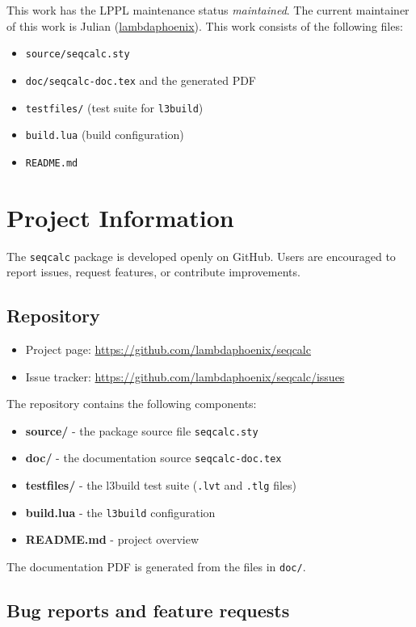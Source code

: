 \documentclass[a4paper,1pt]{article}
\begin{document}
\noindent This work has the LPPL maintenance status \emph{maintained}. The
current maintainer of this work is Julian (\href{https://github.com/lambdaphoenix}{lambdaphoenix}).
This work consists of the following files:
\begin{itemize}
    \item \texttt{source/seqcalc.sty}
    \item \texttt{doc/seqcalc-doc.tex} and the generated PDF
    \item \texttt{testfiles/} (test suite for \texttt{l3build})
    \item \texttt{build.lua} (build configuration)
    \item \texttt{README.md}
\end{itemize}
\section{Project Information}

The \texttt{seqcalc} package is developed openly on GitHub.
Users are encouraged to report issues, request features, or contribute
improvements.

\subsection*{Repository}

\begin{itemize}
    \item Project page:
        \url{https://github.com/lambdaphoenix/seqcalc}
    \item Issue tracker:
        \url{https://github.com/lambdaphoenix/seqcalc/issues}
\end{itemize}
The repository contains the following components:
\begin{itemize}
    \item \textbf{source/} - the package source file \texttt{seqcalc.sty}
    \item \textbf{doc/} - the documentation source \texttt{seqcalc-doc.tex}
    \item \textbf{testfiles/} - the l3build test suite (\texttt{.lvt} and \texttt{.tlg} files)
    \item \textbf{build.lua} - the \texttt{l3build} configuration
    \item \textbf{README.md} - project overview
\end{itemize}
The documentation PDF is generated from the files in \texttt{doc/}.

\subsection*{Bug reports and feature requests}
\end{document}
